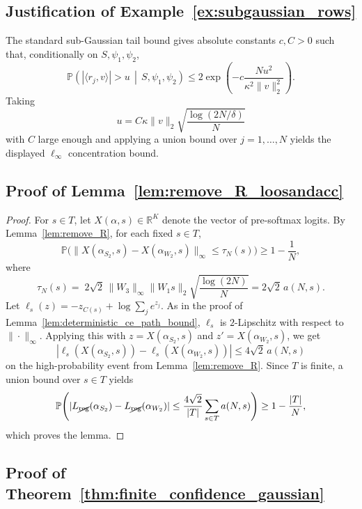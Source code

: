 \documentclass[11pt]{article}
\theoremstyle{plain}
\theoremstyle{definition}
\theoremstyle{remark}
\newcommand{\R}{\mathbb{R}}
\newcommand{\PP}{\mathbb{P}}
\newcommand{\1}{\mathbf{1}}
\begin{document}
\subsection{Justification of Example~\ref{ex:subgaussian_rows}}

The standard sub-Gaussian tail bound gives absolute constants \(c,C>0\) such that, conditionally on \(S,\psi_1,\psi_2\),
\[
\PP\!\left(
|\langle r_j,v\rangle|>u
\,\middle|\,S,\psi_1,\psi_2
\right)
\le
2\exp\!\left(-c\frac{Nu^2}{\kappa^2\|v\|_2^2}\right).
\]
Taking
\[
u=C\kappa\|v\|_2\sqrt{\frac{\log(2N/\delta)}{N}}
\]
with \(C\) large enough and applying a union bound over \(j=1,\dots,N\) yields the displayed \(\ell_\infty\) concentration bound.

\subsection{Proof of Lemma~\ref{lem:remove_R_loosandacc}}

\begin{proof}
For \(s\in T\), let \(X(\alpha,s)\in\R^K\) denote the vector of pre-softmax logits. By Lemma~\ref{lem:remove_R}, for each fixed \(s\in T\),
\[
\PP\Big(
\|X(\alpha_{S_2},s)-X(\alpha_{W_2},s)\|_\infty\le \tau_N(s)
\Big)
\ge
1-\frac{1}{N},
\]
where
\[
\tau_N(s)
=
\;2\sqrt{2}\,\|W_3\|_\infty\|W_1s\|_2\sqrt{\frac{\log(2N)}{N}}
=2\sqrt{2}\,a(N,s).
\]
Let \(\ell_s(z)=-z_{C(s)}+\log\sum_j e^{z_j}\). As in the proof of Lemma~\ref{lem:deterministic_ce_path_bound}, \(\ell_s\) is \(2\)-Lipschitz with respect to \(\|\cdot\|_\infty\).
Applying this with \(z=X(\alpha_{S_2},s)\) and \(z'=X(\alpha_{W_2},s)\), we get
\[
|\ell_s(X(\alpha_{S_2},s))-\ell_s(X(\alpha_{W_2},s))|
\le
4\sqrt{2}\,a(N,s)
\]
on the high-probability event from Lemma~\ref{lem:remove_R}. Since \(T\) is finite, a union bound over \(s\in T\) yields
\[
\PP\!\left(
|L_{\cancel{\mathrm{reg}}}(\alpha_{S_2})-L_{\cancel{\mathrm{reg}}}(\alpha_{W_2})|
\le
\frac{4\sqrt{2}}{|T|}\sum_{s\in T}a(N,s)
\right)
\ge
1-\frac{|T|}{N},
\]
which proves the lemma.
\end{proof}

\subsection{Proof of Theorem~\ref{thm:finite_confidence_gaussian}}
\end{document}
